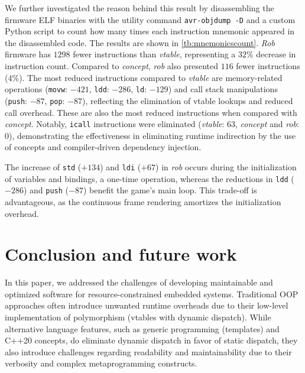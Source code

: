 \documentclass[sigconf]{acmart}
\begin{document}
We further investigated the reason behind this result by disassembling the firmware ELF binaries with the utility command {\tt avr-objdump -D} and a custom Python script to count how many times each instruction mnemonic appeared in the disassembled code. The results are shown in \autoref{tb:mnemonicscount}. \emph{Rob} firmware has $1298$ fewer instructions than \emph{vtable}, representing a $32\%$ decrease in instruction count. Compared to \emph{concept}, \emph{rob} also presented $116$ fewer instructions ($4\%$). The most reduced instructions compared to \emph{vtable} are memory-related operations ({\tt movw}: $-421$, {\tt ldd}: $-286$, {\tt ld}: $-129$) and call stack manipulations ({\tt push}: $-87$, {\tt pop}: $-87$), reflecting the elimination of vtable lookups and reduced call overhead. These are also the most reduced instructions when compared with \emph{concept}. Notably, {\tt icall} instructions were eliminated (\emph{vtable}: $63$, \emph{concept} and \emph{rob}: 0), demonstrating the effectiveness in eliminating runtime indirection by the use of concepts and compiler-driven dependency injection. 

The increase of \texttt{std} ($+134$) and \texttt{ldi} ($+67$) in \textit{rob} occurs during the initialization of variables and bindings, a one-time operation, whereas the reductions in \texttt{ldd} ($-286$) and \texttt{push} ($-87$) benefit the game's main loop. This trade-off is advantageous, as the continuous frame rendering amortizes the initialization overhead.





\section{Conclusion and future work} \label{sec:conclusion}

In this paper, we addressed the challenges of developing maintainable and optimized software for resource-constrained embedded systems. Traditional OOP approaches often introduce unwanted runtime overheads due to their low-level implementation of polymorphism (vtables with dynamic dispatch). While alternative language features, such as generic programming (templates) and C++20 concepts, do eliminate dynamic dispatch in favor of static dispatch, they also introduce challenges regarding readability and maintainability due to their verbosity and complex metaprogramming constructs. 
\end{document}
